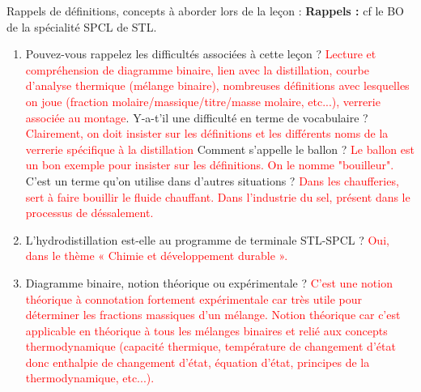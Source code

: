 \begin{reportBlock}{Rappels de définitions, concepts à aborder lors de la leçon : }
\textbf{Rappels : } cf le BO de la spécialité SPCL de STL.

\begin{enumerate}
    \item Pouvez-vous rappelez les difficultés associées à cette leçon ? \textcolor{red}{Lecture et compréhension de diagramme binaire, lien avec la distillation, courbe d'analyse thermique (mélange binaire), nombreuses définitions avec lesquelles on joue (fraction molaire/massique/titre/masse molaire, etc...), verrerie associée au montage}. Y-a-t’il une difficulté en terme de vocabulaire ? \textcolor{red}{Clairement, on doit insister sur les définitions et les différents noms de la verrerie spécifique à la distillation} Comment s’appelle le ballon ? \textcolor{red}{Le ballon est un bon exemple pour insister sur les définitions. On le nomme "bouilleur".} C’est un terme qu’on utilise dans d’autres situations ? \textcolor{red}{Dans les chaufferies, sert à faire bouillir le fluide chauffant. Dans l'industrie du sel, présent dans le processus de déssalement.}
    \item L'hydrodistillation est-elle au programme de terminale STL-SPCL ? \textcolor{red}{Oui, dans le thème « Chimie et développement durable ».}
    \item Diagramme binaire, notion théorique ou expérimentale ? \textcolor{red}{C'est une notion théorique à connotation fortement expérimentale car très utile pour déterminer les fractions massiques d'un mélange. Notion théorique car c'est applicable en théorique à tous les mélanges binaires et relié aux concepts thermodynamique (capacité thermique, température de changement d'état donc enthalpie de changement d'état, équation d'état, principes de la thermodynamique, etc...).}
      
\end{enumerate}

\end{reportBlock}


